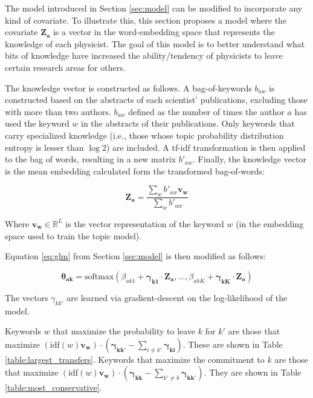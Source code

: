 \documentclass{article}
\begin{document}
The model introduced in Section \ref{sec:model} can be modified to incorporate any kind of covariate. To illustrate this, this section proposes a model where the covariate $\bm{Z_a}$ is a vector in the word-embedding space that represents the knowledge of each physicist. The goal of this model is to better understand what bits of knowledge have increased the ability/tendency of physicists to leave certain research areas for others. 

The knowledge vector is constructed as follows. A bag-of-keywords $b_{aw}$ is constructed based on the abstracts of each scientist' publications, excluding those with more than two authors. $b_{aw}$ defined as the number of times the author $a$ has used the keyword $w$ in the abstracts of their publications. Only keywords that carry specialized knowledge (i.e., those whose topic probability distribution entropy is lesser than $\log 2$) are included. A tf-idf transformation is then applied to the bag of words, resulting in a new matrix $b'_{aw}$. Finally, the knowledge vector is the mean embedding calculated form the transformed bag-of-words:

\begin{equation}
    \bm{Z_{a}} = \dfrac{\sum_w b'_{aw} \bm{v_{w}}}{\sum_w b'_{aw}} 
\end{equation}

Where $\bm{v_w}\in\mathbb{R}^{L}$ is the vector representation of the keyword $w$ (in the embedding space used to train the topic model). 

Equation \eqref{eq:glm} from Section \ref{sec:model} is then modified as follows:

\begin{equation}
    \bm{\theta_{ak}} = \text{softmax}\left(\beta_{ak1} + \bm{\gamma_{k1}}\cdot \bm{Z_{a}}, \dots,\beta_{akK} +  \bm{\gamma_{kK}}\cdot \bm{Z_{a}} \right)
\end{equation}

The vectors $\gamma_{kk'}$ are learned via gradient-descent on the log-likelihood of the model.

Keywords $w$ that maximize the probability to leave $k$ for $k'$ are those that maximize $(\text{idf}(w) \bm{v_w}) \cdot (\bm{\gamma_{kk'}}-\sum_{i \neq k'}\bm{\gamma_{ki}})$. These are shown in Table \ref{table:largest_transfers}.
Keywords that maximize the commitment to $k$ are those that maximize $ (\text{idf}(w) \bm{v_w}) \cdot (\bm{\gamma_{kk}}-\sum_{k' \neq k}\bm{\gamma_{kk'}})$. They are shown in Table \ref{table:most_conservative}.

\fontsize{6}{7}\selectfont\normalsize
\fontsize{6}{7}\selectfont\normalsize




\end{document}
